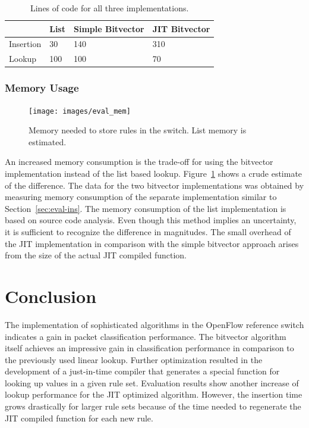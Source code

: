 \documentclass[a4paper,
		12pt,
		parskip=full,
		titlepage
		]{scrartcl}
\begin{document}
\begin{table}
  \centering
  \begin{tabularx}{\textwidth}{l|XXX}
  &List&Simple Bitvector&JIT Bitvector\\
  \hline
  Insertion&30&140&310\\
  Lookup&100&100&70\\
  \end{tabularx}
  \caption{Lines of code for all three implementations.}
  \label{table:loc}
\end{table}

\subsubsection{Memory Usage}

\begin{figure}[H]
\centering
\texttt{[image: images/eval\_mem]}
\caption{Memory needed to store rules in the switch. List memory is estimated.}
\label{fig:eval-mem}
\end{figure}

An increased memory consumption is the trade-off for using the bitvector implementation
instead of the list based lookup.
Figure~\ref{fig:eval-mem} shows a crude estimate of the difference.
The data for the two bitvector implementations was obtained by measuring memory consumption of the separate implementation
similar to Section~\ref{sec:eval-ins}.
The memory consumption of the list implementation is based on source code analysis.
Even though this method implies an uncertainty, it is sufficient to recognize the difference in magnitudes.
The small overhead of the JIT implementation in comparison with the simple bitvector approach
arises from the size of the actual JIT compiled function.

\section{Conclusion}
The implementation of sophisticated algorithms in the OpenFlow reference switch indicates a gain in packet classification performance.
The bitvector algorithm itself achieves an impressive gain in classification 
performance in comparison to the previously used linear lookup.
Further optimization resulted in the development of a just-in-time compiler 
that generates a special function for looking up values in a given rule set.
Evaluation results show another increase of lookup performance for the JIT optimized algorithm.
However, the insertion time grows drastically for larger rule sets because 
of the time needed to regenerate the JIT compiled function for each new rule.
\end{document}
